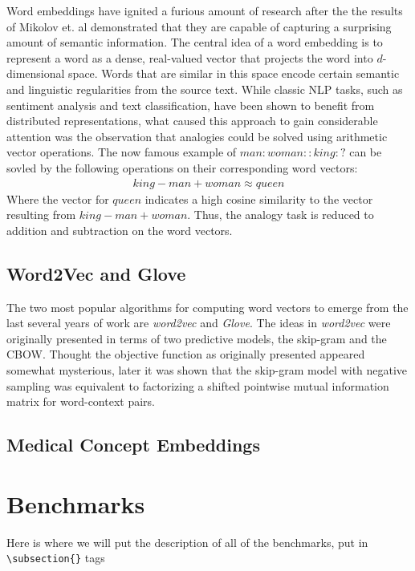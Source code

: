 \documentclass{ws-procs11x85}
\begin{document}
Word embeddings have ignited a furious amount of research after the the results of Mikolov\cite{mikolov2013distributed} et. al demonstrated that they are capable of capturing a surprising amount of semantic information. The central idea of a word embedding is to represent a word as a dense, real-valued vector that projects the word into $d$-dimensional space. Words that are similar in this space encode certain semantic and linguistic regularities from the source text. While classic NLP tasks, such as sentiment analysis and text classification, have been shown to benefit from distributed representations, what caused this approach to gain considerable attention was the observation that analogies could be solved using arithmetic vector operations. The now famous example of $man:woman::king:?$ can be sovled by the following operations on their corresponding word vectors: 
\begin{align}
king - man + woman \approx queen
\end{align}
Where the vector for $queen$ indicates a high cosine similarity to the vector resulting from $king - man + woman$. Thus, the analogy task is reduced to addition and subtraction on the word vectors.

 \subsection{Word2Vec and Glove}
The two most popular algorithms for computing word vectors to emerge from the last several years of work are \emph{word2vec}\cite{mikolov2013distributed} and \emph{Glove}\cite{pennington2014glove}. The ideas in \emph{word2vec} were originally presented in terms of two predictive models, the skip-gram and the CBOW. Thought the objective function as originally presented appeared somewhat mysterious, later it was shown that the skip-gram model with negative sampling was equivalent to factorizing a shifted pointwise mutual information matrix\cite{levy2014neural} for word-context pairs.

 \subsection{Medical Concept Embeddings}

\section{Benchmarks}
Here is where we will put the description of all of the benchmarks, put in \verb|\subsection{}| tags
\end{document}

